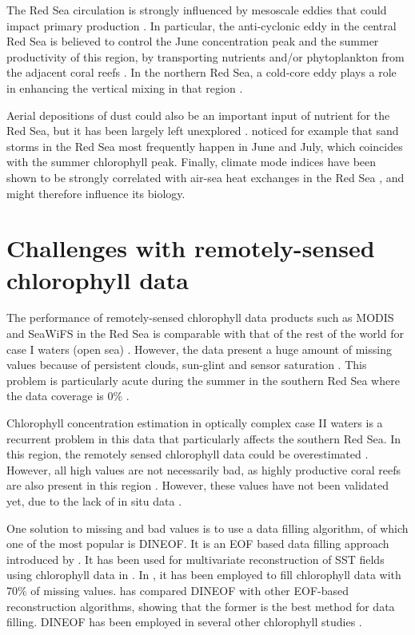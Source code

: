 The Red Sea circulation is strongly influenced by mesoscale eddies \cite{Yao2014, Zhan2014} that could impact primary production \cite{Zhai2013}. In particular, the anti-cyclonic eddy in the central Red Sea is believed to control the June concentration peak and the summer productivity of this region, by transporting nutrients and/or phytoplankton from the adjacent coral reefs \cite{Raitsos2013}. In the northern Red Sea, a cold-core eddy plays a role in enhancing the vertical mixing in that region \cite{Raitsos2013}.

Aerial depositions of dust could also be an important input of nutrient for the Red Sea, but it has been largely left unexplored \cite{Triantafyllou2014}. \cite{Raitsos2013} noticed for example that sand storms in the Red Sea most frequently happen in June and July, which coincides with the summer chlorophyll peak. Finally, climate mode indices have been shown to be strongly correlated with air-sea heat exchanges in the Red Sea \cite{Abulnaja2015}, and might therefore influence its biology.

\section{Challenges with remotely-sensed chlorophyll data}

The performance of remotely-sensed chlorophyll data products such as MODIS and SeaWiFS in the Red Sea is comparable with that of the rest of the world for case I waters (open sea) \cite{Brewin2013}. However, the data present a huge amount of missing values because of persistent clouds, sun-glint and sensor saturation \cite{Racault}. This problem is particularly acute during the summer in the southern Red Sea where the data coverage is 0\% \cite{Racault}.

Chlorophyll concentration estimation in optically complex case II waters is a recurrent problem in this data that particularly affects the southern Red Sea. In this region, the remotely sensed chlorophyll data could be overestimated \cite{Raitsos2013}. However, all high values are not necessarily bad, as highly productive coral reefs are also present in this region \cite{Raitsos2013}. However, these values have not been validated yet, due to the lack of in situ data \cite{Raitsos2013}.

One solution to missing and bad values is to use a data filling algorithm, of which one of the most popular is DINEOF. It is an EOF based data filling approach introduced by \cite{Beckers2003}. It has been used for multivariate reconstruction of SST fields using chlorophyll data in \cite{Alvera2007}. In \cite{Sicarjobs2011}, it has been employed to fill chlorophyll data with 70\% of missing values. \cite{Taylor2013} has compared DINEOF with other EOF-based reconstruction algorithms, showing that the former is the best method for data filling. DINEOF has been employed in several other chlorophyll studies \cite{Miles2010, Waite2013}.


